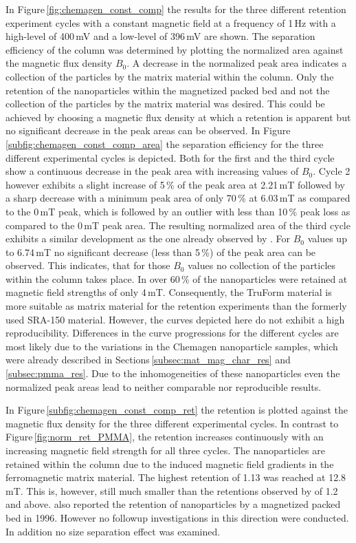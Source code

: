 In Figure\,\ref{fig:chemagen_const_comp} the results for the three different retention experiment cycles with a constant magnetic field at a frequency of 1\,Hz with a high-level of 400\,mV and a low-level of 396\,mV are shown. The separation efficiency of the column was determined by plotting the normalized area against the magnetic flux density $B_{0}$. A decrease in the normalized peak area indicates a collection of the particles by the matrix material within the column. Only the retention of the nanoparticles within the magnetized packed bed and not the collection of the particles by the matrix material was desired. This could be achieved by choosing a magnetic flux density at which a retention is apparent but no significant decrease in the peak areas can be observed. In Figure\,\ref{subfig:chemagen_const_comp_area} the separation efficiency for the three different experimental cycles is depicted. Both for the first and the third cycle show a continuous decrease in the peak area with increasing values of $B_{0}$. Cycle 2 however exhibits a slight increase of 5\,\% of the peak area at 2.21\,mT followed by a sharp decrease with a minimum peak area of only 70\,\% at 6.03\,mT as compared to the 0\,mT peak, which is followed by an outlier with less than 10\,\% peak loss as compared to the 0\,mT peak area. The resulting normalized area of the third cycle exhibits a similar development as the one already observed by \cite{AndreMaster}. For $B_{0}$ values up to 6.74\,mT no significant decrease (less than 5\,\%) of the peak area can be observed. This indicates, that for those $B_{0}$ values no collection of the particles within the column takes place. In \cite{AndreMaster} over 60\,\% of the nanoparticles were retained at magnetic field strengths of only 4\,mT. Consequently, the TruForm material is more suitable as matrix material for the retention experiments than the formerly used SRA-150 material. However, the curves depicted here do not exhibit a high reproducibility.  Differences in the curve progressions for the different cycles are most likely due to the variations in the Chemagen nanoparticle samples, which were already described in Sections\,\ref{subsec:mat_mag_char_res} and \ref{subsec:pmma_res}. Due to the inhomogeneities of these nanoparticles even the normalized peak areas lead to neither comparable nor reproducible results.

In Figure\,\ref{subfig:chemagen_const_comp_ret} the retention is plotted against the magnetic flux density for the three different experimental cycles. In contrast to Figure\,\ref{fig:norm_ret_PMMA}, the retention increases continuously with an increasing magnetic field strength for all three cycles. The nanoparticles are retained within the column due to the induced magnetic field gradients in the ferromagnetic matrix material. The highest retention of 1.13 was reached at 12.8\,mT. This is, however, still much smaller than the retentions observed by \cite{AndreMaster} of 1.2 and above. \cite{nomizu1996magnetic} also reported the retention of nanoparticles by a magnetized packed bed in 1996. However no followup investigations in this direction were conducted. In addition no size separation effect was examined. \newpage

